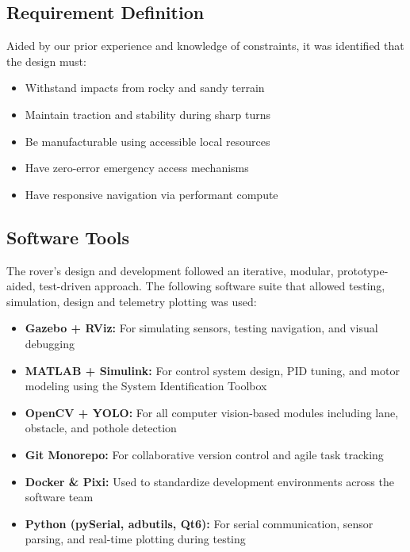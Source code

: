 \documentclass[12pt,a4paper,twocolumn]{article}
\begin{document}
\subsection{Requirement Definition}

Aided by our prior experience and knowledge of constraints, it was identified that the design must:

\begin{itemize}
    \setlength{\itemsep}{1.2pt}
    \setlength{\parskip}{0pt}
    \setlength{\parsep}{0pt}
    \item Withstand impacts from rocky and sandy terrain
    \item Maintain traction and stability during sharp turns
    \item Be manufacturable using accessible local resources
    \item Have zero-error emergency access mechanisms
    \item Have responsive navigation via performant compute
\end{itemize}

\subsection{Software Tools}

The rover's design and development followed an iterative, modular, prototype-aided, test-driven approach.
The following software suite that allowed testing, simulation, design and telemetry plotting was used:

\begin{itemize}
    \setlength{\itemsep}{1pt}
    \setlength{\parskip}{0pt}
    \setlength{\parsep}{0pt}
    \item \textbf{Gazebo + RViz:} For simulating sensors, testing navigation, and visual debugging
    \item \textbf{MATLAB + Simulink:} For control system design, PID tuning, and motor modeling using the System Identification Toolbox
    \item \textbf{OpenCV + YOLO:} For all computer vision-based modules including lane, obstacle, and pothole detection
    \item \textbf{Git Monorepo:} For collaborative version control and agile task tracking
    \item \textbf{Docker \& Pixi:} Used to standardize development environments across the software team
    \item \textbf{Python (pySerial, adbutils, Qt6):} For serial communication, sensor parsing, and real-time plotting during testing
\end{itemize}
\end{document}
